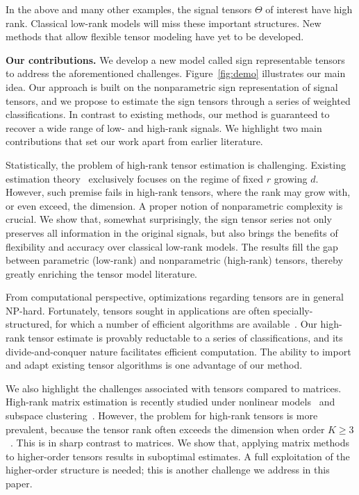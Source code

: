 \documentclass{article}
\theoremstyle{plain}
\theoremstyle{definition}
\begin{document}
In the above and many other examples, the signal tensors $\Theta$ of interest have high rank. Classical low-rank models will miss these important structures. New methods that allow flexible tensor modeling have yet to be developed. 

{\bf Our contributions.}
We develop a new model called sign representable tensors to address the aforementioned challenges. 
Figure~\ref{fig:demo} illustrates our main idea. Our approach is built on the nonparametric sign representation of signal tensors, and we propose to estimate the sign tensors through a series of weighted classifications. In contrast to existing methods, our method is guaranteed to recover a wide range of low- and high-rank signals. We highlight two main contributions that set our work apart from earlier literature. 

Statistically, the problem of high-rank tensor estimation is challenging. Existing estimation theory~\cite{montanari2018spectral,cai2019nonconvex,ghadermarzy2019near} exclusively focuses on the regime of fixed $r$ growing $d$. However, such premise fails in high-rank tensors, where the rank may grow with, or even exceed, the dimension. A proper notion of nonparametric complexity is crucial. We show that, somewhat surprisingly, the sign tensor series not only preserves all information in the original signals, but also brings the benefits of flexibility and accuracy over classical low-rank models. The results fill the gap between parametric (low-rank) and nonparametric (high-rank) tensors, thereby greatly enriching the tensor model literature. 

From computational perspective, optimizations regarding tensors are in general NP-hard. Fortunately, tensors sought in applications are often specially-structured, for which a number of efficient algorithms are available~\cite{ghadermarzy2018learning,wang2018learning, han2020optimal}. Our high-rank tensor estimate is provably reductable to a series of classifications, and its divide-and-conquer nature facilitates efficient computation. The ability to import and adapt existing tensor algorithms is one advantage of our method. 

We also highlight the challenges associated with tensors compared to matrices. High-rank matrix estimation is recently studied under nonlinear models~\cite{ganti2015matrix} and subspace clustering~\cite{pmlr-v70-ongie17a,fan2019online}. However, the problem for high-rank tensors is more prevalent, because the tensor rank often exceeds the dimension when order $K\geq 3$~\cite{anandkumar2017analyzing}. This is in sharp contrast to matrices. We show that, applying matrix methods to higher-order tensors results in suboptimal estimates. A full exploitation of the higher-order structure is needed; this is another challenge we address in this paper.
\end{document}
